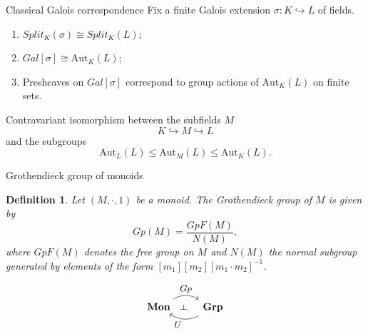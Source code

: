 \documentclass[4pt]{beamer}
\newtheorem{defi}[teo]{Definition}
\begin{document}
\begin{frame}{Classical Galois correspondence}
    Fix a finite Galois extension $\sigma:K\hookrightarrow L$ of fields.

    \vspace{3mm}

    \begin{enumerate}
        \item $Split_{K}(\sigma)\cong Split_{K}(L)$;
        \vspace{1mm}
        \item $Gal[\sigma]\cong \text{Aut}_K(L)$;
        \vspace{1mm}
        \item Presheaves on $Gal[\sigma]$ correspond to group actions of $\text{Aut}_K(L)$ on finite sets.
    \end{enumerate}

    \vspace{3mm}

     Contravariant isomorphism between the subfields $M$
    \[ K\hookrightarrow M\hookrightarrow L \]
    and the subgroups
    \[ \text{Aut}_L(L)\leq \text{Aut}_M(L) \leq \text{Aut}_K(L). \]
\end{frame}

\begin{frame}{Grothendieck group of monoids}
    \begin{defi}
        Let $(M,\cdot, 1)$ be a monoid. The Grothendieck group of $M$ is given by
        \[ Gp(M)=\frac{GpF(M)}{N(M)}, \]
        where $GpF(M)$ denotes the free group on $M$ and $N(M)$ the normal subgroup generated by elements of the form $[m_1][m_2][m_1\cdot m_2]^{-1}$.
    \end{defi}

    \pause

    \[\begin{tikzcd}[every label/.append style = {font = \small}, ampersand replacement=\&]
        \textbf{Mon} \arrow[r, bend left, "Gp", ""{name=Sp}] \& \textbf{Grp} \arrow[l, bend left, "U", ""{name=C}] \arrow[phantom, from=Sp, to=C, "\dashv" rotate=-90]
    \end{tikzcd}\]
\end{frame}
\end{document}
